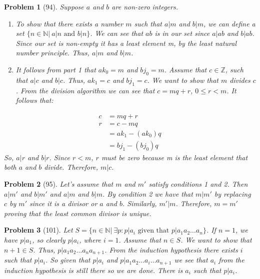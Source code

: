 \documentclass{article}
\theoremstyle{problem}
\newtheorem{prob}{Problem}
\theoremstyle{plain}
\theoremstyle{remark}
\begin{document}
%
\begin{prob}[94]
Suppose $a$ and $b$ are non-zero integers.
\begin{enumerate}
\item To show that there exists a number $m$ such that $a|m$ and $b|m$, we can define a set $\{n \in \mathbb{N} |\ a|n\text{ and }b|n \}$. We can see that $ab$ is in our set since $a|ab$ and $b|ab$. Since our set is non-empty it has a least element m, by the least natural number principle. Thus, $a|m$ and $b|m$.
\item It follows from part 1 that $ak_0 = m$ and $bj_0 = m$. Assume that $c \in \mathbb{Z}$, such that $a|c$ and $b|c$. Thus, $ak_1 = c$ and $bj_1 = c$. We want to show that $m$ divides $c$. From the division algorithm we can see that $c = mq + r$, $0 \leq r < m$. It follows that:
\end{enumerate}
\begin{align*}
  c &= mq + r\\
  r &= c - mq\\
    &= ak_1 - (ak_0)q\\
    &= bj_1 - (bj_0)q
\end{align*}
So, $a|r$ and $b|r$. Since $r < m$, $r$ must be zero because m is the least element that both $a$ and $b$ divide. Therefore, $m|c$.
\end{prob}

%
\begin{prob}[95]
Let's assume that $m$ and $m'$ satisfy conditions 1 and 2. Then $a|m'$ and $b|m'$ and $a|m$ and $b|m$. By condition 2 we have that $m|m'$ by replacing $c$ by $m'$ since it is a divisor or $a$ and $b$. Similarly, $m'|m$. Therefore, $m = m'$ proving that the least common divisor is unique.
\end{prob}

%
\begin{prob}[101]
Let $S = \{n \in \mathbb{N} |\ \exists p : p|a_i \text{ given that }p|a_1a_2\ldots a_n \}$. If $n = 1$, we have $p|a_1$, so clearly $p|a_i$, where $i = 1$. %
Assume that $n \in S$. We want to show that $n + 1 \in S$. Thus, $p | a_1 a_2 \ldots a_n a_{n+1}$. From the induction hypothesis there exists $i$ such that $p|a_i$. So given that $p|a_i$ and $p|a_1 a_2 \ldots a_i \ldots a_{n+1}$ we see that $a_i$ from the induction hypothesis is still there so we are done. There is $a_i$ such that $p|a_i$.
\end{prob}
\end{document}
